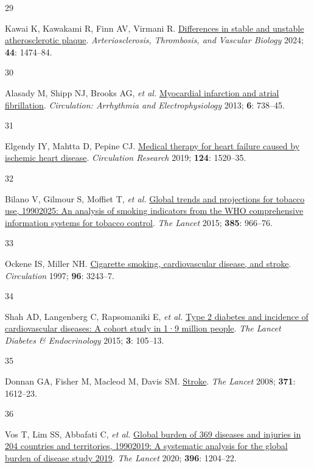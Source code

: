 \documentclass[
  a4paper,
  headsepline=true,
  open=any]{scrbook}
\newlength{\cslhangindent}
\newlength{\csllabelwidth}
\newlength{\cslentryspacingunit} %
\newenvironment{CSLReferences}[2] %
 {%
  \setlength{\parindent}{0pt}
  \ifodd #1
  \let\oldpar\par
  \def\par{\hangindent=\cslhangindent\oldpar}
  \fi
  \setlength{\parskip}{#2\cslentryspacingunit}
 }%
 {}
\newcommand{\CSLLeftMargin}[1]{\parbox[t]{\csllabelwidth}{#1}}
\newcommand{\CSLRightInline}[1]{\parbox[t]{\linewidth - \csllabelwidth}{#1}\break}
\begin{document}
\begin{CSLReferences}{0}{0}
\leavevmode{}%
\CSLLeftMargin{29 }%
\CSLRightInline{Kawai K, Kawakami R, Finn AV, Virmani R.
\href{https://doi.org/10.1161/ATVBAHA.124.319396}{Differences in stable
and unstable atherosclerotic plaque}. \emph{Arteriosclerosis,
Thrombosis, and Vascular Biology} 2024; \textbf{44}: 1474--84.}

\leavevmode{}%
\CSLLeftMargin{30 }%
\CSLRightInline{Alasady M, Shipp NJ, Brooks AG, \emph{et al.}
\href{https://doi.org/10.1161/CIRCEP.113.000163}{Myocardial infarction
and atrial fibrillation}. \emph{Circulation: Arrhythmia and
Electrophysiology} 2013; \textbf{6}: 738--45.}

\leavevmode{}%
\CSLLeftMargin{31 }%
\CSLRightInline{Elgendy IY, Mahtta D, Pepine CJ.
\href{https://doi.org/10.1161/CIRCRESAHA.118.313568}{Medical therapy for
heart failure caused by ischemic heart disease}. \emph{Circulation
Research} 2019; \textbf{124}: 1520--35.}

\leavevmode{}%
\CSLLeftMargin{32 }%
\CSLRightInline{Bilano V, Gilmour S, Moffiet T, \emph{et al.}
\href{https://doi.org/10.1016/S0140-6736(15)60264-1}{Global trends and
projections for tobacco use, 1990{\textendash}2025: An analysis of
smoking indicators from the WHO comprehensive information systems for
tobacco control}. \emph{The Lancet} 2015; \textbf{385}: 966--76.}

\leavevmode{}%
\CSLLeftMargin{33 }%
\CSLRightInline{Ockene IS, Miller NH.
\href{https://doi.org/10.1161/01.CIR.96.9.3243}{Cigarette smoking,
cardiovascular disease, and stroke}. \emph{Circulation} 1997;
\textbf{96}: 3243--7.}

\leavevmode{}%
\CSLLeftMargin{34 }%
\CSLRightInline{Shah AD, Langenberg C, Rapsomaniki E, \emph{et al.}
\href{https://doi.org/10.1016/S2213-8587(14)70219-0}{Type 2 diabetes and
incidence of cardiovascular diseases: A cohort study in 1·9 million
people}. \emph{The Lancet Diabetes \& Endocrinology} 2015; \textbf{3}:
105--13.}

\leavevmode{}%
\CSLLeftMargin{35 }%
\CSLRightInline{Donnan GA, Fisher M, Macleod M, Davis SM.
\href{https://doi.org/10.1016/S0140-6736(08)60694-7}{Stroke}. \emph{The
Lancet} 2008; \textbf{371}: 1612--23.}

\leavevmode{}%
\CSLLeftMargin{36 }%
\CSLRightInline{Vos T, Lim SS, Abbafati C, \emph{et al.}
\href{https://doi.org/10.1016/S0140-6736(20)30925-9}{Global burden of
369 diseases and injuries in 204 countries and territories,
1990{\textendash}2019: A systematic analysis for the global burden of
disease study 2019}. \emph{The Lancet} 2020; \textbf{396}: 1204--22.}


\end{CSLReferences}
\end{document}
